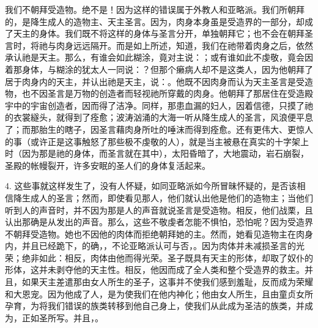 我们不朝拜受造物。绝不是！因为这样的错误属于外教人和亚略派。我们所朝拜的，是降生成人的造物主、天主圣言。因为，肉身本身虽是受造界的一部分，却成了天主的身体。我们既不将这样的身体与圣言分开，单独朝拜它；也不会在朝拜圣言时，将祂与肉身远远隔开。而是如上所述，知道，我们在祂带着肉身之后，依然承认祂是天主。那么，有谁会如此糊涂，竟对主说：；或有谁如此不虔敬，竟会因着那身体，与糊涂的犹太人一同说：？但那个癞病人却不是这类人，因为他朝拜了居于肉身内的天主，并认出祂是天主，说：。他既不因肉身而认为天主圣言是受造物，也不因圣言是万物的创造者而轻视祂所穿戴的肉身。他朝拜了那居住在受造殿宇中的宇宙创造者，因而得了洁净。同样，那患血漏的妇人，因着信德，只摸了祂的衣裳繸头，就得到了痊愈；波涛汹涌的大海一听从降生成人的圣言，风浪便平息了；而那胎生的瞎子，因圣言藉肉身所吐的唾沫而得到痊愈。还有更伟大、更惊人的事（或许正是这事触怒了那些极不虔敬的人），就是当主被悬在真实的十字架上时（因为那是祂的身体，而圣言就在其中），太阳昏暗了，大地震动，岩石崩裂，圣殿的帐幔裂开，许多安眠的圣人们的身体复活起来。\par

4. 这些事就这样发生了，没有人怀疑，如同亚略派如今所冒昧怀疑的，是否该相信降生成人的圣言；然而，即使看见那人，他们就认出他是他们的造物主；当他们听到人的声音时，并不因为那是人的声音就说圣言是受造物。相反，他们战栗，且认出那确是从发出的声音。那么，这些不敬虔者怎能不惧怕，恐怕呢？因为受造界不朝拜受造物。她也不因他的肉体而拒绝朝拜她的主。然而，她看见造物主在肉身内，并且已经跪下，的确，，不论亚略派认可与否，。因为肉体并未减损圣言的光荣；绝非如此：相反，肉体由他而得光荣。圣子既具有天主的形体，却取了奴仆的形体，这并未剥夺他的天主性。相反，他因而成了全人类和整个受造界的救主。并且，如果天主差遣那由女人所生的圣子，这事并不使我们感到羞耻，反而成为荣耀和大恩宠。因为他成了人，是为使我们在他内神化；他由女人所生，且由童贞女所孕育，为将我们错误的族类转移到他自己身上，使我们从此成为圣洁的族类，并成为，正如圣所写。并且，。\par


